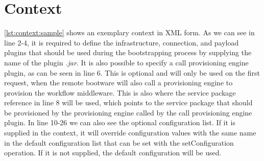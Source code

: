 \section{Context}
\label{implementation:context}

\vspace*{\baselineskip}

\autoref{lst:context:sample} shows an exemplary context in XML form.
As we can see in line 2-4, it is required to define the infrastructure, connection, and payload plugins that should be used during the bootstrapping process by supplying the name of the plugin \textit{.jar}.
It is also possible to specify a call provisioning engine plugin, as can be seen in line 6.
This is optional and will only be used on the first request, when the remote bootware will also call a provisioning engine to provision the workflow middleware.
This is also where the service package reference in line 8 will be used, which points to the service package that should be provisioned by the provisioning engine called by the call provisioning engine plugin.
In line 10-26 we can also see the optional configuration list.
If it is supplied in the context, it will override configuration values with the same name in the default configuration list that can be set with the setConfiguration operation.
If it is not supplied, the default configuration will be used.
